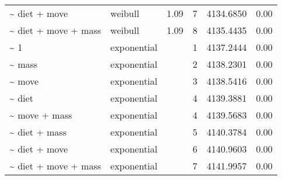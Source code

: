 \begin{table}[ht]
\begin{tabular}{llrrrr}
  \~{} diet + move & weibull & 1.09 & 7 & 4134.6850 & 0.00 \\ 
  \~{} diet + move + mass & weibull & 1.09 & 8 & 4135.4435 & 0.00 \\ 
  \~{} 1 & exponential &  & 1 & 4137.2444 & 0.00 \\ 
  \~{} mass & exponential &  & 2 & 4138.2301 & 0.00 \\ 
  \~{} move & exponential &  & 3 & 4138.5416 & 0.00 \\ 
  \~{} diet & exponential &  & 4 & 4139.3881 & 0.00 \\ 
  \~{} move + mass & exponential &  & 4 & 4139.5683 & 0.00 \\ 
  \~{} diet + mass & exponential &  & 5 & 4140.3784 & 0.00 \\ 
  \~{} diet + move & exponential &  & 6 & 4140.9603 & 0.00 \\ 
  \~{} diet + move + mass & exponential &  & 7 & 4141.9957 & 0.00 \\ 
  \end{tabular}
\label{tab:nag}
\end{table}
